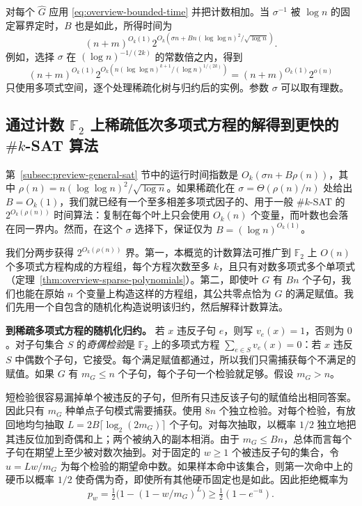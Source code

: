 \documentclass[11pt,reqno]{amsart}
\numberwithin{equation}{section}
\theoremstyle{definition}\newtheorem{definition}[theorem]{定义}
\theoremstyle{remark}\newtheorem{remark}[theorem]{注}
\renewcommand{\le}{\leqslant}
\renewcommand{\ge}{\geqslant}
\begin{document}
对每个 $\widehat G$ 应用 \eqref{eq:overview-bounded-time} 并把计数相加。当 $\sigma^{-1}$ 被 $\log n$ 的固定幂界定时，$B$ 也是如此，所得时间为
\[
 (n+m)^{O_k(1)}
 2^{O_k\!\left(\sigma n+
          Bn(\log\log n)^2/\sqrt{\log n}\right)}.
\]
例如，选择 $\sigma$ 在 $(\log n)^{-1/(2k)}$ 的常数倍之内，得到
\[
 (n+m)^{O_k(1)}
 2^{O_k\!\left(n(\log\log n)^{k+1}/(\log n)^{1/(2k)}\right)}
   = (n+m)^{O_k(1)}2^{o(n)}
\]
只使用多项式空间，逐个处理稀疏化树与归约后的实例。参数 $\sigma$ 可以取有理数。

\subsection{通过计数 \texorpdfstring{$\mathbb F_2$}{F\_2} 上稀疏低次多项式方程的解得到更快的 \texorpdfstring{$\#k$-SAT}{\#k-SAT} 算法}
\label{subsec:preview-full-case}

第~\ref{subsec:preview-general-sat} 节中的运行时间指数是 $O_k(\sigma n+B\rho(n))$，其中 $\rho(n)=n(\log\log n)^2/\sqrt{\log n}$。如果稀疏化在 $\sigma=\Theta(\rho(n)/n)$ 处给出 $B=O_k(1)$，我们就已经有一个至多相差多项式因子的、用于一般 $\#k$-SAT 的 $2^{O_k(\rho(n))}$ 时间算法：复制在每个叶上只会使用 $O_k(n)$ 个变量，而叶数也会落在同一界内。然而，在这个 $\sigma$ 选择下，保证仅为 $B=(\log n)^{O_k(1)}$。

我们分两步获得 $2^{O_k(\rho(n))}$ 界。第一，本概览的计数算法可推广到 $\mathbb F_2$ 上 $O(n)$ 个多项式方程构成的方程组，每个方程次数至多 $k$，且只有对数多项式多个单项式（定理~\ref{thm:overview-sparse-polynomials}）。第二，即使叶 $G$ 有 $Bn$ 个子句，我们也能在原始 $n$ 个变量上构造这样的方程组，其公共零点恰为 $G$ 的满足赋值。我们先用一个自包含的随机化构造说明该归约，然后解释计数算法。

\medskip\noindent
\textbf{到稀疏多项式方程的随机化归约。}
若 $x$ 违反子句 $e$，则写 $v_e(x)=1$，否则为 $0$。对子句集合 $S$ 的\emph{奇偶检验}是 $\mathbb F_2$ 上的多项式方程 $\sum_{e\in S}v_e(x)=0$：若 $x$ 违反 $S$ 中偶数个子句，它接受。每个满足赋值都通过，所以我们只需捕获每个不满足的赋值。如果 $G$ 有 $m_G\le n$ 个子句，每个子句一个检验就足够。假设 $m_G>n$。

短检验很容易漏掉单个被违反的子句，但所有只违反该子句的赋值给出相同答案。因此只有 $m_G$ 种单点子句模式需要捕获。使用 $8n$ 个独立检验。对每个检验，有放回地均匀抽取 $L=2B\lceil\log_2(2m_G)\rceil$ 个子句。对每次抽取，以概率 $1/2$ 独立地把其违反位加到奇偶和上；两个被纳入的副本相消。由于 $m_G\le Bn$，总体而言每个子句在期望上至少被对数次抽到。对于固定的 $w\ge1$ 个被违反子句的集合，令 $u=Lw/m_G$ 为每个检验的期望命中数。如果样本命中该集合，则第一次命中上的硬币以概率 $1/2$ 使奇偶为奇，即使所有其他硬币固定也是如此。因此拒绝概率为
\[
 p_w=\tfrac12\bigl(1-(1-w/m_G)^L\bigr)\ge\tfrac12(1-e^{-u}).
\]
\end{document}
